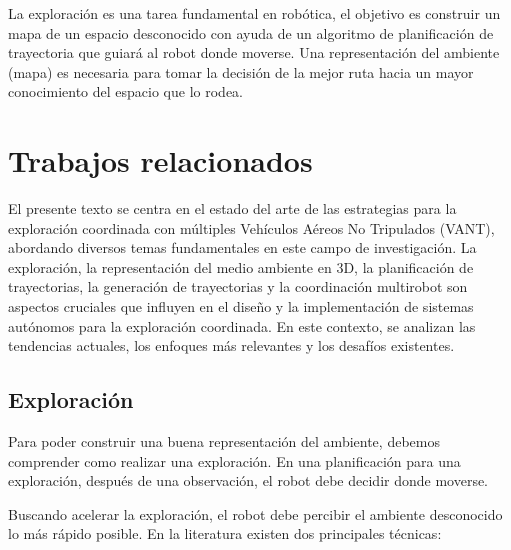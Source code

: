 
La exploración es una tarea fundamental en robótica, el objetivo es construir un mapa de un espacio desconocido con ayuda de un algoritmo de planificación de trayectoria que guiará al robot donde moverse. Una representación del ambiente (mapa) es necesaria para tomar la decisión de la mejor ruta hacia un mayor conocimiento del espacio que lo rodea.



\section{Trabajos relacionados} \label{}

El presente texto se centra en el estado del arte de las estrategias para la exploración coordinada con múltiples Vehículos Aéreos No Tripulados (VANT), abordando diversos temas fundamentales en este campo de investigación. La exploración, la representación del medio ambiente en 3D, la planificación de trayectorias, la generación de trayectorias y la coordinación multirobot son aspectos cruciales que influyen en el diseño y la implementación de sistemas autónomos para la exploración coordinada. En este contexto, se analizan las tendencias actuales, los enfoques más relevantes y los desafíos existentes.


\subsection{Exploración}

Para poder construir una buena representación del ambiente, debemos comprender como realizar una exploración. En una planificación para una exploración, después de una observación, el robot debe decidir donde moverse.

Buscando acelerar la exploración, el robot debe percibir el ambiente desconocido lo más rápido posible. En la literatura existen dos principales técnicas:

